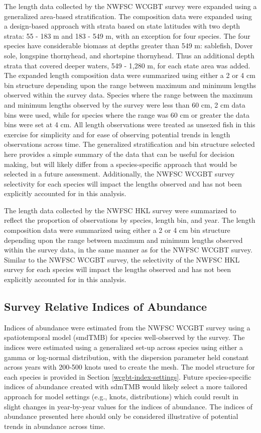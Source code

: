 \documentclass[11pt,
  letterpaper,
]{article}
\begin{document}
The length data collected by the NWFSC WCGBT survey were expanded using a generalized area-based stratification. The composition data were expanded using a design-based approach with strata based on state latitudes with two depth strata: 55 - 183 m and 183 - 549 m, with an exception for four species. The four species have considerable biomass at depths greater than 549 m: sablefish, Dover sole, longspine thornyhead, and shortspine thornyhead. Thus an additional depth strata that covered deeper waters, 549 - 1,280 m, for each state area was added. The expanded length composition data were summarized using either a 2 or 4 cm bin structure depending upon the range between maximum and minimum lengths observed within the survey data. Species where the range between the maximum and minimum lengths observed by the survey were less than 60 cm, 2 cm data bins were used, while for species where the range was 60 cm or greater the data bins were set at 4 cm. All length observations were treated as unsexed fish in this exercise for simplicity and for ease of observing potential trends in length observations across time. The generalized stratification and bin structure selected here provides a simple summary of the data that can be useful for decision making, but will likely differ from a species-specific approach that would be selected in a future assessment. Additionally, the NWFSC WCGBT survey selectivity for each species will impact the lengths observed and has not been explicitly accounted for in this analysis.

The length data collected by the NWFSC HKL survey were summarized to reflect the proportion of observations by species, length bin, and year. The length composition data were summarized using either a 2 or 4 cm bin structure depending upon the range between maximum and minimum lengths observed within the survey data, in the same manner as for the NWFSC WCGBT survey. Similar to the NWFSC WCGBT survey, the selectivity of the NWFSC HKL survey for each species will impact the lengths observed and has not been explicitly accounted for in this analysis.

\subsection{Survey Relative Indices of Abundance}\label{survey-relative-indices-of-abundance}

Indices of abundance were estimated from the NWFSC WCGBT survey using a spatiotemporal model (smdTMB) for species well-observed by the survey. The indices were estimated using a generalized set-up across species using either a gamma or log-normal distribution, with the dispersion parameter held constant across years with 200-500 knots used to create the mesh. The model structure for each species is provided in Section \ref{wcgbt-index-settings}. Future species-specific indices of abundance created with sdmTMB would likely select a more tailored approach for model settings (e.g., knots, distributions) which could result in slight changes in year-by-year values for the indices of abundance. The indices of abundance presented here should only be considered illustrative of potential trends in abundance across time.
\end{document}
